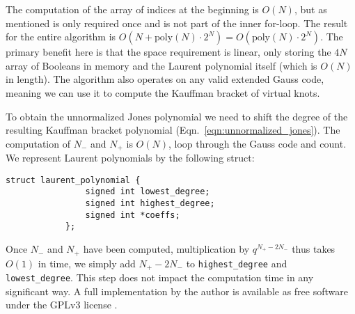         \par\hfill\par
        The computation of the array of indices at the beginning
        is $O(N)$, but as mentioned is only required once and is not part of
        the inner for-loop. The result for the entire algorithm is
        $O(N+\textrm{poly}(N)\cdot{2}^{N})=O(\textrm{poly}(N)\cdot{2}^{N})$.
        The primary benefit here is that the space
        requirement is linear, only storing the $4N$ array of Booleans in
        memory and the Laurent polynomial itself (which is $O(N)$ in length).
        The algorithm also operates on any valid extended Gauss code, meaning
        we can use it to compute the Kauffman bracket of virtual knots.
        \par\hfill\par
        To obtain the unnormalized Jones polynomial we need to shift
        the degree of the resulting Kauffman bracket polynomial
        (Eqn.~\ref{eqn:unnormalized_jones}). The computation of $N_{-}$ and
        $N_{+}$ is $O(N)$, loop through the Gauss code and count.
        We represent Laurent polynomials by the following struct:
        \begin{lstlisting}[style=CStyle, gobble=12]
            struct laurent_polynomial {
                signed int lowest_degree;
                signed int highest_degree;
                signed int *coeffs;
            };
        \end{lstlisting}
        Once $N_{-}$ and $N_{+}$ have been computed,
        multiplication by $q^{N_{+}-2N_{-}}$ thus takes $O(1)$ in time, we
        simply add $N_{+}-2N_{-}$ to \texttt{highest\_degree} and
        \texttt{lowest\_degree}. This step does not impact the computation time
        in any significant way. A full implementation by the author is
        available as free software under the GPLv3 license
        \cite{MaguireJones}.
